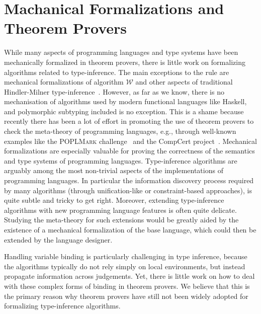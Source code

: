 \section{Machanical Formalizations and Theorem Provers}

While many aspects of programming languages and type systems
have been mechanically formalized in theorem provers, there is little work on
formalizing algorithms related to type-inference. The main exceptions to the rule
are mechanical formalizations of algorithm $\mathcal{W}$ and other aspects
of traditional Hindler-Milner 
type-inference~\citep{naraschewski1999type,dubois2000proving,
dubois1999certification,urban2008nominal,garrigue2015certified}.
However, as far as we know, there is no mechanisation of algorithms 
used by modern functional languages like Haskell, and
polymorphic subtyping included is no exception.  
This is a shame because recently there has been a lot of effort
in promoting the use of theorem provers to check the meta-theory 
of programming languages, e.g., through well-known examples like the \textsc{POPLMark} challenge~\citep{aydemir2005mechanized} and the CompCert project~\citep{leroy2012compcert}.
Mechanical formalizations are especially valuable for proving the
correctness of the semantics and type systems 
of programming languages. Type-inference algorithms are arguably among
the most non-trivial aspects of the implementations of programming
languages. In particular the information discovery process required by 
many algorithms (through unification-like or constraint-based
approaches), is quite subtle and tricky to get right. Moreover,
extending type-inference algorithms with new programming language features is often quite 
delicate. Studying the meta-theory for such extensions would be
greatly aided by the existence of a mechanical
formalization of the base language, which could then be extended by
the language designer.

Handling variable binding is particularly challenging in type inference,
because the algorithms typically do not rely simply on local environments, but
instead propagate information across judgements. Yet, there is little work on
how to deal with these complex forms of binding in theorem provers. We believe
that this is the primary reason why theorem provers have still not been widely
adopted for formalizing type-inference algorithms.

